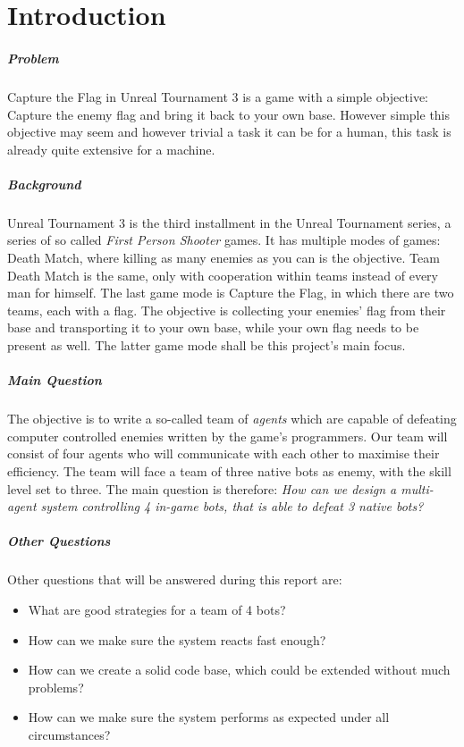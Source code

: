 \chapter{Introduction}

\paragraph{Problem}
Capture the Flag in Unreal Tournament 3 is a game with a simple objective: Capture the enemy flag and bring it back to your own base. However simple this objective may seem and however trivial a task it can be for a human, this task is already quite extensive for a machine.

\paragraph{Background}
Unreal Tournament 3 is the third installment in the Unreal Tournament series, a series of so called \emph{First Person Shooter} games. It has multiple modes of games: Death Match, where killing as many enemies as you can is the objective. Team Death Match is the same, only with cooperation within teams instead of every man for himself. The last game mode is Capture the Flag, in which there are two teams, each with a flag. The objective is collecting your enemies' flag from their base and transporting it to your own base, while your own flag needs to be present as well. The latter game mode shall be this project's main focus.

\paragraph{Main Question}
The objective is to write a so-called team of \emph{agents} which are capable of defeating computer controlled enemies written by the game's programmers. Our team will consist of four agents who will communicate with each other to maximise their efficiency. The team will face a team of three native bots as enemy, with the skill level set to three. The main question is therefore: \emph{How can we design a multi-agent system controlling 4 in-game bots, that is able to defeat 3 native bots?}

\paragraph{Other Questions}
Other questions that will be answered during this report are:
\begin{itemize}
	\item What are good strategies for a team of 4 bots? 
	\item How can we make sure the system reacts fast enough? 
	\item How can we create a solid code base, which could be extended without much problems? 
	\item How can we make sure the system performs as expected under all circumstances? 
\end{itemize}

